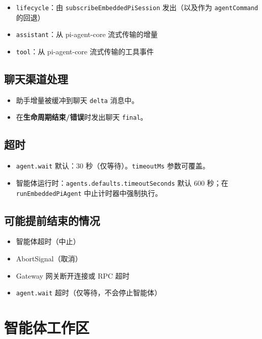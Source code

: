 \begin{itemize}
  \item \texttt{lifecycle}：由 \texttt{subscribeEmbeddedPiSession} 发出（以及作为 \texttt{agentCommand} 的回退）
  \item \texttt{assistant}：从 pi-agent-core 流式传输的增量
  \item \texttt{tool}：从 pi-agent-core 流式传输的工具事件
\end{itemize}


\subsection{聊天渠道处理}


\begin{itemize}
  \item 助手增量被缓冲到聊天 \texttt{delta} 消息中。
  \item 在\textbf{生命周期结束/错误}时发出聊天 \texttt{final}。
\end{itemize}


\subsection{超时}


\begin{itemize}
  \item \texttt{agent.wait} 默认：30 秒（仅等待）。\texttt{timeoutMs} 参数可覆盖。
  \item 智能体运行时：\texttt{agents.defaults.timeoutSeconds} 默认 600 秒；在 \texttt{runEmbeddedPiAgent} 中止计时器中强制执行。
\end{itemize}


\subsection{可能提前结束的情况}


\begin{itemize}
  \item 智能体超时（中止）
  \item AbortSignal（取消）
  \item Gateway 网关断开连接或 RPC 超时
  \item \texttt{agent.wait} 超时（仅等待，不会停止智能体）
\end{itemize}



\clearpage

\section{智能体工作区}


